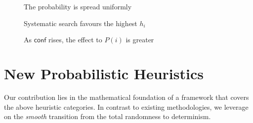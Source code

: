 \documentclass{ws-ijait}
\begin{document}
\begin{figure}
\centering

\caption{The probability is spread uniformly\label{uniform}}
\end{figure}

\begin{figure}
\centering

\caption{Systematic search favours the highest $h_i$\label{systematic}}
\end{figure}

\begin{figure}
\centering

\caption{As $\mathsf{conf}$ rises, the effect to $P(i)$ is greater\label{conf}}
\end{figure}


\section{New Probabilistic Heuristics}

Our contribution lies in the mathematical foundation of a framework that covers the above heuristic categories. In contrast to existing methodologies, we leverage on the \emph{smooth} transition from the total randomness to determinism.
\end{document}

